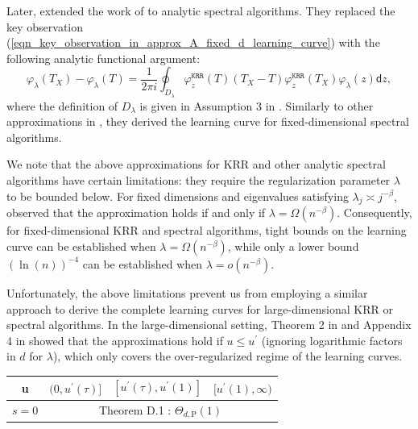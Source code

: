 \documentclass{article}
\theoremstyle{plain}
\theoremstyle{definition}
\theoremstyle{remark}
\newcommand{\reg}{\varphi_\lambda}
\newcommand*{\krr}{\mathtt{KRR}}
\begin{document}
\begin{appendix}
Later, \cite{li2024generalization} extended the work of \cite{li2023asymptotic} to analytic spectral algorithms. They replaced the key observation (\ref{eqn_key_observation_in_approx_A_fixed_d_learning_curve}) with the following analytic functional argument:
$$
\reg(T_X)-\reg(T) = \frac{1}{2\pi i}\oint_{D_{\lambda}} \varphi_{z}^{\krr}(T) (T_{X}-T) \varphi_{z}^{\krr}(T_{X}) \reg(z) \mathsf{d} z,
$$
where the definition of $D_{\lambda}$ is given in Assumption 3 in \cite{li2024generalization}. Similarly to other approximations in \cite{li2023asymptotic}, they derived the learning curve for fixed-dimensional spectral algorithms.



We note that the above approximations for KRR and other analytic spectral algorithms have certain limitations: they require the regularization parameter $\lambda$ to be bounded below. For fixed dimensions and eigenvalues satisfying $\lambda_j \asymp j^{-\beta}$, \citep{li2024generalization, li2023asymptotic} observed that the approximation holds if and only if $\lambda = \Omega(n^{-\beta})$. Consequently, for fixed-dimensional KRR and spectral algorithms, 
tight bounds on the learning curve can be established when $\lambda = \Omega(n^{-\beta})$, while only a lower bound $(\ln(n))^{-4}$ can be established when $\lambda = o(n^{-\beta})$.


Unfortunately, the above limitations prevent us from employing a similar approach to derive the complete learning curves for large-dimensional KRR or spectral algorithms. In the large-dimensional setting, Theorem 2 in \cite{zhang2024optimal} and Appendix 4 in \cite{lu2024saturation} showed that the approximations hold if $u \leq u^{\prime}$ (ignoring logarithmic factors in $d$ for $\lambda$), which only covers the over-regularized regime of the learning curves.




\iffalse
\begin{table}[h!]
\centering
\renewcommand{\arraystretch}{1.6}
\begin{tabular}{|c|c|c|c|}
\hline
u 
& $(0, u^{\prime}(\tau)]$ 
& $[u^{\prime}(\tau), u^{\prime}(1)]$ 
& $[u^{\prime}(1), \infty)$ \\
\hline

$s=0$ 
& \multicolumn{3}{c|}{Theorem D.1 : $\Theta_{d, \mathrm{P}}(1)$} \\
\hline


\end{tabular}
\end{table}
\end{appendix}
\end{document}
